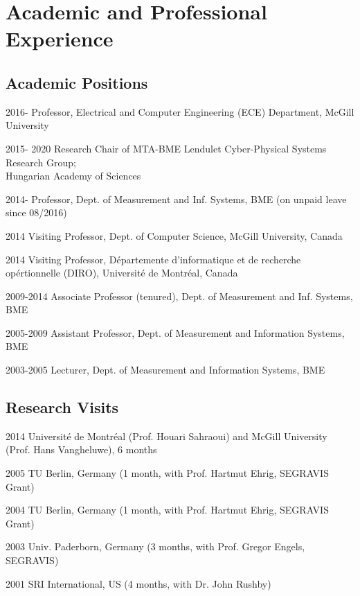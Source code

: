 \section{Academic and Professional Experience}
\subsection{Academic Positions}
\begin{yearlist}
\item[2016-] Professor, Electrical and Computer Engineering (ECE) Department, McGill University
\item[2015- 2020] Research Chair of MTA-BME Lendulet Cyber-Physical Systems Research Group; \\ Hungarian Academy of Sciences 
\item[2014-] Professor, Dept. of Measurement and Inf. Systems, BME  (on unpaid leave since 08/2016)
\item[2014] Visiting Professor, Dept. of Computer Science, McGill University, Canada
\item[2014] Visiting Professor, D\'epartemente d'informatique et de recherche op\'ertionnelle (DIRO), Universit\'e de Montr\'eal, Canada
\item[2009-2014] Associate Professor (tenured), Dept. of Measurement and Inf. Systems, BME 	
\item[2005-2009] Assistant Professor, Dept. of Measurement and Information Systems, BME 
\item[2003-2005] Lecturer, Dept. of Measurement and Information Systems, BME
\end{yearlist}

\subsection{Research Visits} 
\begin{yearlist}
\item[2014] Universit\'e de Montr\'eal (Prof. Houari Sahraoui) and McGill University (Prof. Hans Vangheluwe),  6 months
\item[2005] TU Berlin, Germany (1 month, with Prof. Hartmut Ehrig, SEGRAVIS Grant)
\item[2004] TU Berlin, Germany (1 month, with Prof. Hartmut Ehrig, SEGRAVIS Grant)
\item[2003] Univ. Paderborn, Germany (3 months, with Prof. Gregor Engels, SEGRAVIS) 
\item[2001] SRI International, US (4 months, with Dr. John Rushby) 
\end{yearlist}

